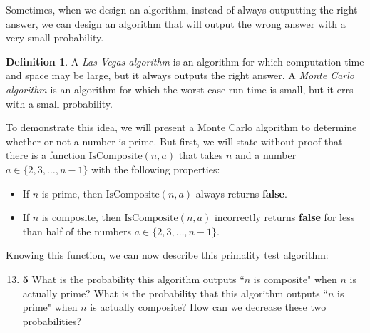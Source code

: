 \documentclass[12pt]{article}
\theoremstyle{plain}
\theoremstyle{definition}
\newtheorem{defn}{Definition}[section]
\theoremstyle{remark}
\newcommand{\pts}[1]{\lbrack\textbf{#1}\rbrack}
\begin{document}
Sometimes, when we design an algorithm, instead of always outputting the right answer, we can design an algorithm that will output the wrong answer with a very small probability.

\begin{defn}
A \emph{Las Vegas algorithm} is an algorithm for which computation time and space may be large, but it always outputs the right answer. A \emph{Monte Carlo algorithm} is an algorithm for which the worst-case run-time is small, but it errs with a small probability.
\end{defn}

To demonstrate this idea, we will present a Monte Carlo algorithm to determine whether or not a number is prime. But first, we will state without proof that there is a function $\text{IsComposite}(n,a)$ that takes $n$ and a number $a\in\{2,3,\dots,n-1\}$ with the following properties:

\begin{itemize}
\item If $n$ is prime, then $\text{IsComposite}(n,a)$ always returns \textbf{false}.

\item If $n$ is composite, then $\text{IsComposite}(n,a)$ incorrectly returns \textbf{false} for less than half of the numbers $a\in\{2,3,\dots,n-1\}$.
\end{itemize}

Knowing this function, we can now describe this primality test algorithm:

\begin{algorithm}
\DontPrintSemicolon
{}
\end{algorithm}

\vspace{-10pt}

\begin{enumerate}
\setcounter{enumi}{12}

\item \pts{5} What is the probability this algorithm outputs ``$n$ is composite" when $n$ is actually prime? What is the probability that this algorithm outputs ``$n$ is prime" when $n$ is actually composite? How can we decrease these two probabilities?

\begin{comment}\begin{tcolorbox}
If $n$ is prime, $\text{IsComposite}(n,a)$ always evaluates to \textbf{false}, so the algorithm never outputs ``$n$ is composite" and hence the probability is $0$.  If $n$ is composite, the algorithm outputs ``$n$ is prime" with probability less than $2^{-100}$. To decrease this probability, change $100$ to a larger number in the algorithm.
\end{tcolorbox}\end{comment}
\end{enumerate}
\end{document}
